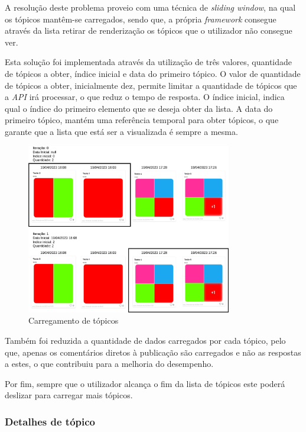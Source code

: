 A resolução deste problema proveio com uma técnica de \textit{sliding window}, na qual os tópicos mantêm-se carregados, sendo que, a própria \textit{framework} consegue através da lista retirar de renderização os tópicos que o utilizador não consegue ver. 

Esta solução foi implementada através da utilização de três valores, quantidade de tópicos a obter, índice inicial e data do primeiro tópico. O valor de quantidade de tópicos a obter, inicialmente dez, permite limitar a quantidade de tópicos que a \textit{API} irá processar, o que reduz o tempo de resposta. O índice inicial, indica qual o índice do primeiro elemento que se deseja obter da lista. A data do primeiro tópico, mantém uma referência temporal para obter tópicos, o que garante que a lista que está ser a visualizada é sempre a mesma.

\begin{figure}[htb]
  \centering
  \includegraphics[width=0.8\textwidth]{images/implementacao/frontend/forum/loading_topics/topics_loading.png}
  \caption{Carregamento de tópicos}
  \label{fig:74}
\end{figure}
Também foi reduzida a quantidade de dados carregados por cada tópico, pelo que, apenas os comentários diretos à publicação são carregados e não as respostas a estes, o que contribuiu para a melhoria do desempenho.

Por fim, sempre que o utilizador alcança o fim da lista de tópicos este poderá deslizar para carregar mais tópicos.

\newpage

\subsubsection{Detalhes de tópico}

